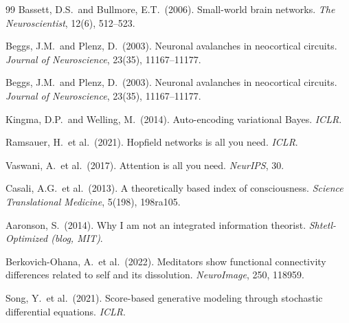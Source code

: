 \documentclass[12pt,a4paper]{article}
\theoremstyle{plain}
\theoremstyle{definition}
\theoremstyle{remark}
\begin{document}
\begin{thebibliography}{99}
Bassett, D.S.\ and Bullmore, E.T.\ (2006).
Small-world brain networks.
\textit{The Neuroscientist}, 12(6), 512--523.

Beggs, J.M.\ and Plenz, D.\ (2003).
Neuronal avalanches in neocortical circuits.
\textit{Journal of Neuroscience}, 23(35), 11167--11177.

Beggs, J.M.\ and Plenz, D.\ (2003).
Neuronal avalanches in neocortical circuits.
\textit{Journal of Neuroscience}, 23(35), 11167--11177.

Kingma, D.P.\ and Welling, M.\ (2014).
Auto-encoding variational Bayes.
\textit{ICLR}.

Ramsauer, H.\ et al.\ (2021).
Hopfield networks is all you need.
\textit{ICLR}.

Vaswani, A.\ et al.\ (2017).
Attention is all you need.
\textit{NeurIPS}, 30.

Casali, A.G.\ et al.\ (2013).
A theoretically based index of consciousness.
\textit{Science Translational Medicine}, 5(198), 198ra105.

Aaronson, S.\ (2014).
Why I am not an integrated information theorist.
\textit{Shtetl-Optimized (blog, MIT)}.

Berkovich-Ohana, A.\ et al.\ (2022).
Meditators show functional connectivity differences related to self and its dissolution.
\textit{NeuroImage}, 250, 118959.

Song, Y.\ et al.\ (2021).
Score-based generative modeling through stochastic differential equations.
\textit{ICLR}.

\end{thebibliography}
\end{document}
